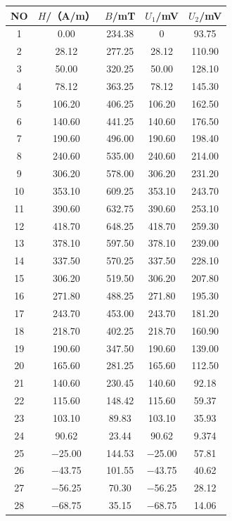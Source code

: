 \documentclass[a4paper,12pt]{article}
\begin{document}
\begin{table}[h]
\centering
\fontsize{10pt}{14pt}\selectfont
\begin{tabular}{c c c c c}
\toprule
NO & $H$/（A/m） & $B$/mT & $U_1$/mV & $U_2$/mV \\
\midrule
1  & 0.00     & 234.38  & 0      & 93.75  \\
2  & 28.12    & 277.25  & 28.12  & 110.90 \\
3  & 50.00    & 320.25  & 50.00  & 128.10 \\
4  & 78.12    & 363.25  & 78.12  & 145.30 \\
5  & 106.20   & 406.25  & 106.20 & 162.50 \\
6  & 140.60   & 441.25  & 140.60 & 176.50 \\
7  & 190.60   & 496.00  & 190.60 & 198.40 \\
8  & 240.60   & 535.00  & 240.60 & 214.00 \\
9  & 306.20   & 578.00  & 306.20 & 231.20 \\
10 & 353.10   & 609.25  & 353.10 & 243.70 \\
11 & 390.60   & 632.75  & 390.60 & 253.10 \\
12 & 418.70   & 648.25  & 418.70 & 259.30 \\
13 & 378.10   & 597.50  & 378.10 & 239.00 \\
14 & 337.50   & 570.25  & 337.50 & 228.10 \\
15 & 306.20   & 519.50  & 306.20 & 207.80 \\
16 & 271.80   & 488.25  & 271.80 & 195.30 \\
17 & 243.70   & 453.00  & 243.70 & 181.20 \\
18 & 218.70   & 402.25  & 218.70 & 160.90 \\
19 & 190.60   & 347.50  & 190.60 & 139.00 \\
20 & 165.60   & 281.25  & 165.60 & 112.50 \\
21 & 140.60   & 230.45  & 140.60 & 92.18  \\
22 & 115.60   & 148.42  & 115.60 & 59.37  \\
23 & 103.10   & 89.83   & 103.10 & 35.93  \\
24 & 90.62    & 23.44   & 90.62  & 9.374  \\
25 & $-$25.00 & 144.53  & $-$25.00 & 57.81 \\
26 & $-$43.75 & 101.55  & $-$43.75 & 40.62 \\
27 & $-$56.25 & 70.30   & $-$56.25 & 28.12 \\
28 & $-$68.75 & 35.15   & $-$68.75 & 14.06 \\
\bottomrule
\end{tabular}
\end{table}
\end{document}
